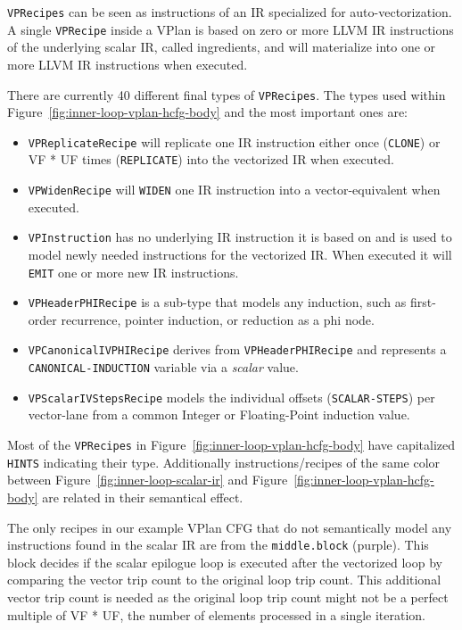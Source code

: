 \documentclass[sigplan,11pt,nonacm]{acmart}
\begin{document}
\texttt{VPRecipes} can be seen as instructions of an IR specialized for auto-vectorization. 
A single \texttt{VPRecipe} inside a VPlan is based on zero or more LLVM IR instructions 
of the underlying scalar IR, called ingredients, and will materialize into one or more LLVM IR 
instructions when executed.

There are currently 40 different final types of \texttt{VPRecipes}. The types used 
within Figure~\ref{fig:inner-loop-vplan-hcfg-body} and the most important ones are:
\begin{itemize}
  \item \texttt{VPReplicateRecipe} will replicate one IR instruction either once (\texttt{CLONE})
  or VF * UF times (\texttt{REPLICATE}) into the vectorized IR when executed.
  \item \texttt{VPWidenRecipe} will \texttt{WIDEN} one IR instruction into a
  vector-equivalent when executed.
  \item \texttt{VPInstruction} has no underlying IR instruction it is based on and is used 
  to model newly needed instructions for the vectorized IR. When executed it will 
  \texttt{EMIT} one or more new IR instructions.
  \item \texttt{VPHeaderPHIRecipe} is a sub-type that models any induction, such as first-order 
  recurrence, pointer induction, or reduction as a phi node.
  \item \texttt{VPCanonicalIVPHIRecipe} derives from \texttt{VPHeaderPHIRecipe} and represents a 
  \texttt{CANONICAL-INDUCTION} variable via a \textit{scalar} value.
  \item \texttt{VPScalarIVStepsRecipe} models the individual offsets (\texttt{SCALAR-STEPS}) per 
  vector-lane from a common Integer or Floating-Point induction value.
\end{itemize}

Most of the \texttt{VPRecipes} in Figure~\ref{fig:inner-loop-vplan-hcfg-body} have capitalized 
\texttt{HINTS} indicating their type. Additionally instructions/recipes of the same color 
between Figure~\ref{fig:inner-loop-scalar-ir} and Figure~\ref{fig:inner-loop-vplan-hcfg-body}
are related in their semantical effect. 

The only recipes in our example VPlan CFG that do not semantically model any 
instructions found in the scalar IR are from the \texttt{middle.block} (purple). 
This block decides if the scalar epilogue loop is executed after the vectorized loop by 
comparing the vector trip count to the original loop trip count. This additional vector trip count is 
needed as the original loop trip count might not be a perfect multiple of VF * UF, the number of elements 
processed in a single iteration.
\end{document}

